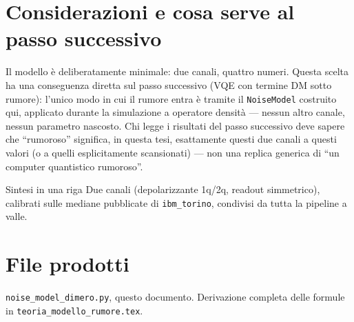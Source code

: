 \documentclass[11pt,a4paper]{article}
\begin{document}
\section{Considerazioni e cosa serve al passo successivo}

Il modello è deliberatamente minimale: due canali, quattro numeri. Questa
scelta ha una conseguenza diretta sul passo successivo (VQE con termine
DM sotto rumore): l'unico modo in cui il rumore entra è tramite il
\texttt{NoiseModel} costruito qui, applicato durante la simulazione a
operatore densità --- nessun altro canale, nessun parametro nascosto.
Chi legge i risultati del passo successivo deve sapere che ``rumoroso''
significa, in questa tesi, esattamente questi due canali a questi
valori (o a quelli esplicitamente scansionati) --- non una replica
generica di ``un computer quantistico rumoroso''.

\begin{okbox}{Sintesi in una riga}
Due canali (depolarizzante 1q/2q, readout simmetrico), calibrati sulle
mediane pubblicate di \texttt{ibm\_torino}, condivisi da tutta la
pipeline a valle.
\end{okbox}

\section*{File prodotti}

\texttt{noise\_model\_dimero.py}, questo documento. Derivazione completa
delle formule in \texttt{teoria\_modello\_rumore.tex}.
\end{document}
